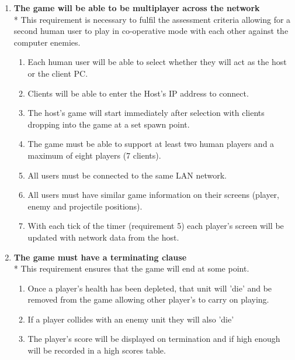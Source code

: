 \begin{enumerate}
\item \textbf{The game will be able to be multiplayer across the network}
\\* This requirement is necessary to fulfil the assessment criteria allowing for a second human user to play in co-operative mode with each other against the computer enemies.
\begin{enumerate}
\item Each human user will be able to select whether they will act as the host or the client PC.
\item Clients will be able to enter the Host's IP address to connect.
\item The host's game will start immediately after selection with clients dropping into the game at a set spawn point.
\item The game must be able to support at least two human players and a maximum of eight players (7 clients).
\item All users must be connected to the same LAN network.
\item All users must have similar game information on their screens (player, enemy and projectile positions).
\item With each tick of the timer (requirement 5) each player's screen will be updated with network data from the host.
\end{enumerate}

\item \textbf{The game must have a terminating clause}
\\* This requirement ensures that the game will end at some point.
\begin{enumerate}
\item Once a player's health has been depleted, that unit will 'die' and be removed from the game allowing other player's to carry on playing.
\item If a player collides with an enemy unit they will also 'die'
\item The player's score will be displayed on termination and if high enough will be recorded in a high scores table.
\end{enumerate}


\end{enumerate}
